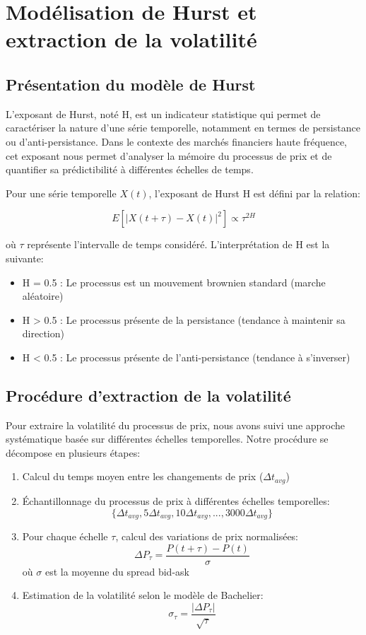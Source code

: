\documentclass[12pt,a4paper]{article}
\theoremstyle{definition}
\theoremstyle{remark}
\begin{document}
\section{Modélisation de Hurst et extraction de la volatilité}

\subsection{Présentation du modèle de Hurst}

L'exposant de Hurst, noté H, est un indicateur statistique qui permet de caractériser la nature d'une série temporelle, notamment en termes de persistance ou d'anti-persistance. Dans le contexte des marchés financiers haute fréquence, cet exposant nous permet d'analyser la mémoire du processus de prix et de quantifier sa prédictibilité à différentes échelles de temps.

Pour une série temporelle \(X(t)\), l'exposant de Hurst H est défini par la relation:

\[
E[|X(t+\tau) - X(t)|^2] \propto \tau^{2H}
\]

où \(\tau\) représente l'intervalle de temps considéré. L'interprétation de H est la suivante:
\begin{itemize}
    \item H = 0.5 : Le processus est un mouvement brownien standard (marche aléatoire)
    \item H > 0.5 : Le processus présente de la persistance (tendance à maintenir sa direction)
    \item H < 0.5 : Le processus présente de l'anti-persistance (tendance à s'inverser)
\end{itemize}

\subsection{Procédure d'extraction de la volatilité}

Pour extraire la volatilité du processus de prix, nous avons suivi une approche systématique basée sur différentes échelles temporelles. Notre procédure se décompose en plusieurs étapes:

\begin{enumerate}
    \item Calcul du temps moyen entre les changements de prix (\(\Delta t_{avg}\))
    \item Échantillonnage du processus de prix à différentes échelles temporelles:
    \[\{\Delta t_{avg}, 5\Delta t_{avg}, 10\Delta t_{avg}, ..., 3000\Delta t_{avg}\}\]
    \item Pour chaque échelle \(\tau\), calcul des variations de prix normalisées:
    \[\Delta P_{\tau} = \frac{P(t+\tau) - P(t)}{\sigma}\]
    où \(\sigma\) est la moyenne du spread bid-ask
    \item Estimation de la volatilité selon le modèle de Bachelier:
    \[\sigma_{\tau} = \frac{|\Delta P_{\tau}|}{\sqrt{\tau}}\]
\end{enumerate}
\end{document}
